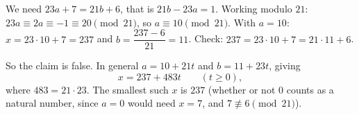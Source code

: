 We need $23a+7=21b+6$, that is $21b-23a=1$. Working modulo $21$: $23a\equiv2a\equiv-1\equiv20\pmod{21}$, so $a\equiv10\pmod{21}$. With $a=10$: $x=23\cdot10+7=237$ and $b=\dfrac{237-6}{21}=11$. Check: $237=23\cdot10+7=21\cdot11+6$.

So the claim is false. In general $a=10+21t$ and $b=11+23t$, giving
\[
x=237+483t\qquad(t\ge0),
\]
where $483=21\cdot23$. The smallest such $x$ is $\boxed{237}$ (whether or not $0$ counts as a natural number, since $a=0$ would need $x=7$, and $7\not\equiv6\pmod{21}$).
